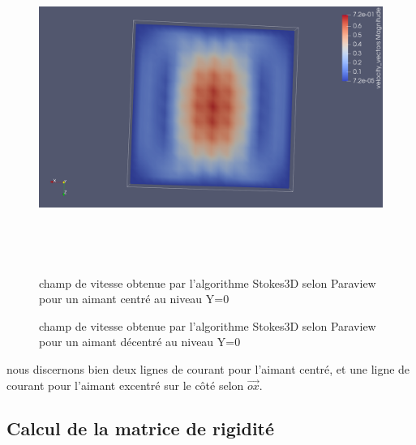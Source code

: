 \documentclass[a4paper,12pt,titlepage]{report}
\begin{document}
\begin{onehalfspace}
\begin{figure}[!h]
\end{figure}
\begin{figure}[!h]

\includegraphics[height = 10cm, keepaspectratio]{graphes/Champ_de_vitesse_selon_Y_centre_ampli.png} 
\caption{\label{figure 3 } champ de vitesse obtenue par l'algorithme Stokes3D selon Paraview pour un aimant centré au niveau Y=0}
\caption{\label{figure 3 } champ de vitesse obtenue par l'algorithme Stokes3D selon Paraview pour un aimant décentré au niveau Y=0}
\end{figure}
nous discernons bien deux lignes de courant pour l'aimant centré, et une ligne de courant pour l'aimant excentré sur le côté selon $\vec{ox}$.


\begin{appendix}
\chapter{Calcul de la matrice de rigidité}
\label{annexe_1}


\end{appendix}
\end{onehalfspace}
\end{document}
